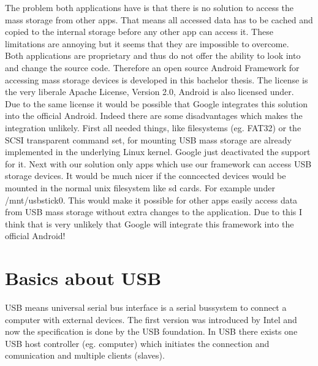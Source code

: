 The problem both applications have is that there is no solution to access the mass storage from other apps. That means all accessed data has to be cached and copied to the internal storage before any other app can access it. These limitations are annoying but it seems that they are impossible to overcome.\\
Both applications are proprietary and thus do not offer the ability to look into and change the source code. Therefore an open source Android Framework for accessing mass storage devices is developed in this bachelor thesis. The license is the very liberale Apache License, Version 2.0, Android is also licensed under.\\
Due to the same license it would be possible that Google integrates this solution into the official Android. Indeed there are some disadvantages which makes the integration unlikely. First all needed things, like filesystems (eg. FAT32) or the SCSI transparent command set, for mounting USB mass storage are already implemented in the underlying Linux kernel. Google just deactivated the support for it. Next with our solution only apps which use our framework can access USB storage devices. It would be much nicer if the conncected devices would be mounted in the normal unix filesystem like sd cards. For example under /mnt/usbstick0. This would make it possible for other apps easily access data from USB mass storage without extra changes to the application. Due to this I think that is very unlikely that Google will integrate this framework into the official Android!
 
\section{Basics about USB}

USB means universal serial bus interface is a serial bussystem to connect a computer with external devices. The first version was introduced by Intel and now the specification is done by the USB foundation. In USB there exists one USB host controller (eg. computer) which initiates the connection and comunication and multiple clients (slaves). 
